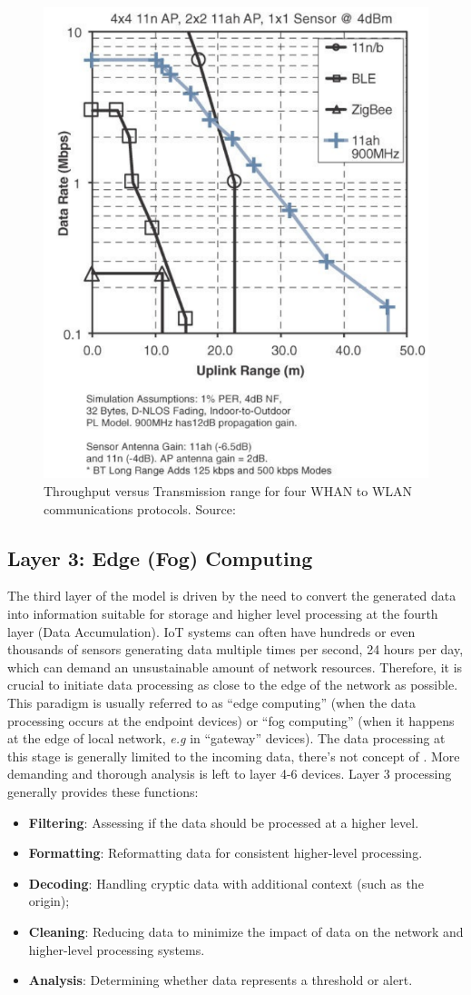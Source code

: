 \begin{figure}[H]
    \centering
    \includegraphics[width=0.55\linewidth]{images/communication-protocols-throughput.png}
    \caption{Throughput versus Transmission range for four WHAN to WLAN communications protocols. Source: \cite{10.5555/3161403}}
    \label{fig:communication-protocols-throughput}
\end{figure}


\subsection{Layer 3: Edge (Fog) Computing}
\label{sec:iot-model-layer3}

The third layer of the model is driven by the need to convert the generated data into information suitable for storage and higher level processing at the fourth layer (Data Accumulation). \acs{IoT} systems can often have hundreds or even thousands of sensors generating data multiple times per second, 24 hours per day, which can demand an unsustainable amount of network resources. Therefore, it is crucial to initiate data processing as close to the edge of the network as possible. This paradigm is usually referred to as ``edge computing'' (when the data processing occurs at the endpoint devices) or ``fog computing'' (when it happens at the edge of local network, \textit{e.g} in ``gateway'' devices). The data processing at this stage is generally limited to the incoming data, there's not concept of . More demanding and thorough analysis is left to layer 4-6 devices. Layer 3 processing generally provides these functions:

\begin{itemize}
    \item \textbf{Filtering}: Assessing if the data should be processed at a higher level. 
    \item \textbf{Formatting}: Reformatting data for consistent higher-level processing.
    \item \textbf{Decoding}: Handling cryptic data with additional context (such as the origin);
    \item \textbf{Cleaning}: Reducing data to minimize the impact of data on the network and higher-level processing systems.
    \item \textbf{Analysis}: Determining whether data represents a threshold or alert.
\end{itemize}


